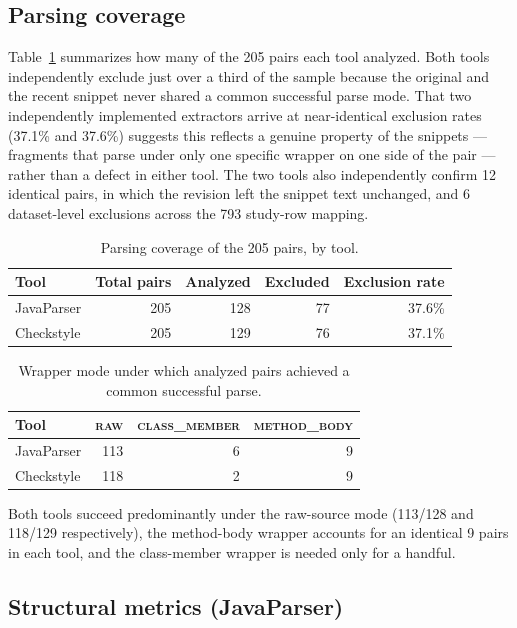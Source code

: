 \subsection{Parsing coverage}
\label{sec:or-coverage}

Table~\ref{tab:or-coverage} summarizes how many of the 205 pairs each tool analyzed.
Both tools independently exclude just over a third of the sample because the original and the recent snippet never shared a common successful parse mode.
That two independently implemented extractors arrive at near-identical exclusion rates (37.1\% and 37.6\%) suggests this reflects a genuine property of the snippets --- fragments that parse under only one specific wrapper on one side of the pair --- rather than a defect in either tool.
The two tools also independently confirm 12 identical pairs, in which the revision left the snippet text unchanged, and 6 dataset-level exclusions across the 793 study-row mapping.

\begin{table}[htbp]
\centering
\caption{Parsing coverage of the 205 pairs, by tool.}
\label{tab:or-coverage}
\begin{tabular}{lrrrr}
\toprule
Tool & Total pairs & Analyzed & Excluded & Exclusion rate \\
\midrule
JavaParser & 205 & 128 & 77 & 37.6\% \\
Checkstyle & 205 & 129 & 76 & 37.1\% \\
\bottomrule
\end{tabular}
\end{table}

\begin{table}[htbp]
\centering
\caption{Wrapper mode under which analyzed pairs achieved a common successful parse.}
\label{tab:or-parse-mode}
\begin{tabular}{lrrr}
\toprule
Tool & \textsc{raw} & \textsc{class\_member} & \textsc{method\_body} \\
\midrule
JavaParser & 113 & 6 & 9 \\
Checkstyle & 118 & 2 & 9 \\
\bottomrule
\end{tabular}
\end{table}

Both tools succeed predominantly under the raw-source mode (113/128 and 118/129 respectively), the method-body wrapper accounts for an identical 9 pairs in each tool, and the class-member wrapper is needed only for a handful.

\subsection{Structural metrics (JavaParser)}
\label{sec:or-javaparser}

